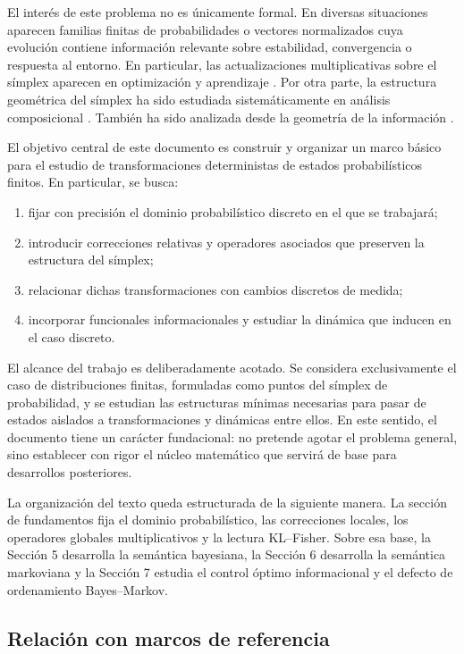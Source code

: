 \documentclass[12pt]{article}
\begin{document}
El interés de este problema no es únicamente formal. En diversas situaciones aparecen familias finitas de probabilidades o vectores normalizados cuya evolución contiene información relevante sobre estabilidad, convergencia o respuesta al entorno. En particular, las actualizaciones multiplicativas sobre el símplex aparecen en optimización y aprendizaje \citep{KivinenWarmuth1997}. Por otra parte, la estructura geométrica del símplex ha sido estudiada sistemáticamente en análisis composicional \citep{Aitchison1986}. También ha sido analizada desde la geometría de la información \citep{AmariNagaoka2000}.

El objetivo central de este documento es construir y organizar un marco básico para el estudio de transformaciones deterministas de estados probabilísticos finitos. En particular, se busca:
\begin{enumerate}
    \item fijar con precisión el dominio probabilístico discreto en el que se trabajará;
    \item introducir correcciones relativas y operadores asociados que preserven la estructura del símplex;
    \item relacionar dichas transformaciones con cambios discretos de medida;
    \item incorporar funcionales informacionales y estudiar la dinámica que inducen en el caso discreto.
\end{enumerate}

El alcance del trabajo es deliberadamente acotado. Se considera exclusivamente el caso de distribuciones finitas, formuladas como puntos del símplex de probabilidad, y se estudian las estructuras mínimas necesarias para pasar de estados aislados a transformaciones y dinámicas entre ellos. En este sentido, el documento tiene un carácter fundacional: no pretende agotar el problema general, sino establecer con rigor el núcleo matemático que servirá de base para desarrollos posteriores.

La organización del texto queda estructurada de la siguiente manera. La sección de fundamentos fija el dominio probabilístico, las correcciones locales, los operadores globales multiplicativos y la lectura KL--Fisher. Sobre esa base, la Sección 5 desarrolla la semántica bayesiana, la Sección 6 desarrolla la semántica markoviana y la Sección 7 estudia el control óptimo informacional y el defecto de ordenamiento Bayes--Markov.
\subsection*{Relación con marcos de referencia}
\end{document}
